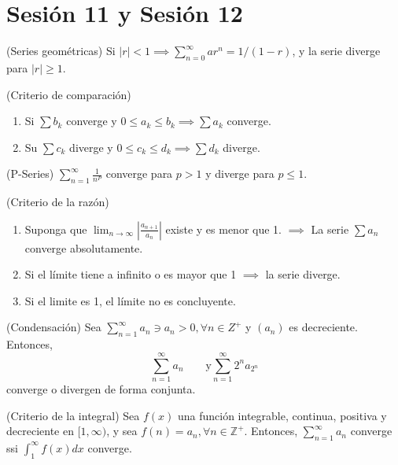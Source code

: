 \section{Sesión 11 y Sesión 12}

\begin{prop}(Series geométricas)
	Si $|r|<1\implies \sum_{n=0}^{\infty}ar^n=1/(1-r)$, y la serie diverge para $|r|\geq 1$. 
\end{prop}

\begin{prop}(Criterio de comparación)
	\begin{enumerate}
		\item Si $\sum b_k$ converge y $0\leq a_k\leq b_k\implies \sum a_k$ converge. 
		\item Su $\sum c_k$ diverge y $0\leq c_k\leq d_k\implies \sum d_k$ diverge. 
	\end{enumerate}
\end{prop}

\begin{prop}(P-Series)
	$\sum_{n=1}^{\infty} \frac{1}{n^P}$ converge para $p>1$ y diverge para $p\leq 1$. 
\end{prop}

\begin{prop}(Criterio de la razón) 
	\begin{enumerate}
		\item Suponga que $\lim_{n\to\infty}|\frac{a_{n+1}}{a_n}|$ existe y es menor que 1. $\implies$ La serie $\sum a_n$ converge absolutamente. 
		\item Si el límite tiene a infinito o es mayor que 1 $\implies$ la serie diverge.
		\item Si el limite es 1, el límite no es concluyente. 
	\end{enumerate}
\end{prop}

\begin{teorema} (Condensación)
	Sea $\sum_{n=1}^{\infty}a_n\ni a_n>0, \forall n\in Z^+$ y $(a_n)$ es decreciente. Entonces, 
	$$\sum_{n=1}^{\infty}a_n\qquad \text{y} \sum_{n=1}^{\infty}2^n a_{2^n}$$
	converge o divergen de forma conjunta. 
\end{teorema}

\begin{prop}(Criterio de la integral)
	Sea $f(x)$ una función integrable, continua, positiva y decreciente en $[1,\infty)$, y sea $f(n)=a_n,\forall n\in \mathbb{Z}^+$. Entonces, $\sum_{n=1}^{\infty}a_n$ converge ssi $\int_1^\infty f(x)dx$ converge. 
\end{prop}


